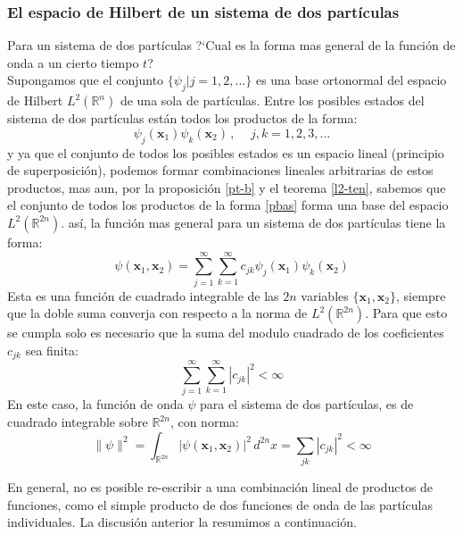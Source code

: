 \documentclass[12pt]{book}
\numberwithin{equation}{chapter}
\def\R{\mathbb{R}}
\def\x{\mathbf{x}}
\begin{document}
\subsubsection{El espacio de Hilbert de un sistema de dos part\'iculas}
Para un sistema de dos part\'iculas ?`Cual es la forma mas general de la funci\'on de onda a un cierto tiempo $t$?\\
Supongamos que el conjunto $\{ \psi_{j} | j=1,2,... \}$ es una base ortonormal del espacio de Hilbert $L^{2}(\R^{n})$ de una sola de part\'iculas. Entre los posibles estados del sistema de dos part\'iculas est\'an todos  los productos de la forma:
\begin{equation}\label{pbas}
\psi_{j}(\x_{1}) \psi_{k}(\x_{2}) \,,\,\,\,\,\,\,\, j,k = 1,2,3,...
\end{equation}
y ya que el conjunto de todos los posibles estados es un espacio lineal (principio de superposici\'on), podemos formar combinaciones lineales arbitrarias de estos productos, mas aun, por la proposici\'on \ref{pt-b} y el teorema \ref{l2-ten}, sabemos que el conjunto de todos los productos de la forma \eqref{pbas} forma una base del espacio $L^{2}(\R^{2n})$. as\'i, la funci\'on mas general para un sistema de dos part\'iculas tiene la forma:
\begin{equation}
\psi (\x_{1} , \x_{2})= \sum_{j=1}^{\infty} \sum_{k=1}^{\infty} c_{jk} \psi_{j}(\x_{1}) \psi_{k}(\x_{2})
\end{equation}
Esta es una funci\'on de cuadrado integrable de las $2n$ variables $\{ \x_{1} , \x_{2} \}$, siempre que la doble suma converja con respecto a la norma de $L^{2}(\R^{2n})$. Para que esto se cumpla solo es necesario que la suma del modulo cuadrado de los coeficientes $c_{jk}$ sea finita:
\begin{equation}
\sum_{j=1}^{\infty} \sum_{k=1}^{\infty} |c_{jk}|^{2} < \infty
\end{equation}
En este caso, la funci\'on de onda $\psi$ para el sistema de dos part\'iculas, es de cuadrado integrable sobre $\R^{2n}$, con norma:
\begin{equation}
\| \psi \|^{2} = \int_{\R^{2n}} |\psi( \x_{1},\x_{2} )|^{2}\, d^{2n}x = \sum_{jk} |c_{jk}|^{2} < \infty
\end{equation}

En general, no es posible re-escribir a una combinaci\'on lineal de productos de funciones, como el simple producto de dos funciones de onda de las part\'iculas individuales. La discusi\'on anterior la resumimos a continuaci\'on.
\end{document}
